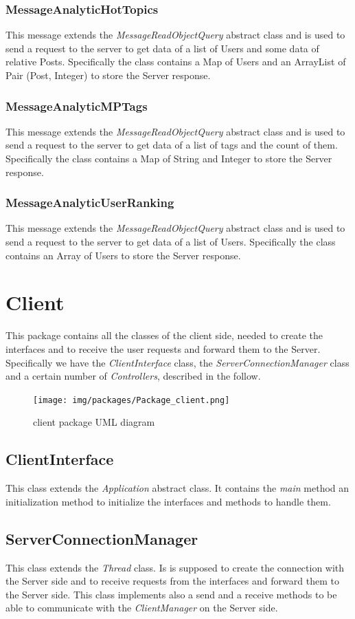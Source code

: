 \documentclass[11pt]{report}
\begin{document}
\subsubsection{MessageAnalyticHotTopics}
This message extends the \textit{MessageReadObjectQuery} abstract class and is used to send a request to the server to get data of a list of Users and some data of relative Posts. Specifically the class contains a Map of Users and an ArrayList of Pair (Post, Integer) to store the Server response.
\subsubsection{MessageAnalyticMPTags}
This message extends the \textit{MessageReadObjectQuery} abstract class and is used to send a request to the server to get data of a list of tags and the count of them. Specifically the class contains a Map of String and Integer to store the Server response.
\subsubsection{MessageAnalyticUserRanking}
This message extends the \textit{MessageReadObjectQuery} abstract class and is used to send a request to the server to get data of a list of Users. Specifically the class contains an Array of Users to store the Server response.
\newpage
\section{Client}
This package contains all the classes of the client side, needed to create the interfaces and to receive the user requests and forward them to the Server. Specifically we have the \textit{ClientInterface} class, the \textit{ServerConnectionManager} class and a certain number of \textit{Controllers}, described in the follow.
\begin{figure}[H]
  \centering
  \texttt{[image: img/packages/Package\_client.png]}
  \caption{client package UML diagram}
\end{figure}
\subsection{ClientInterface}
This class extends the \textit{Application} abstract class. It contains the \textit{main} method an initialization method to initialize the interfaces and methods to handle them.
\subsection{ServerConnectionManager}
This class extends the \textit{Thread} class. Is is supposed to create the connection with the Server side and to receive requests from the interfaces and forward them to the Server side. This class implements also a send and a receive methods to be able to communicate with the \textit{ClientManager} on the Server side.
\end{document}
